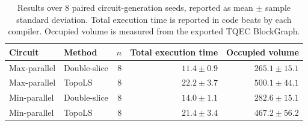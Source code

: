 \begin{table}[t]
    \centering
    \setlength{\tabcolsep}{10pt}
    \caption{Results over 8 paired circuit-generation seeds, reported as mean $\pm$ sample standard deviation.
    Total execution time is reported in code beats by each compiler. Occupied volume is measured from the exported TQEC BlockGraph.}
    \label{tab:topols_circuit_seeds}
    \begin{tabular}{llrrr}
        \toprule
        Circuit & Method & $n$ & Total execution time & Occupied volume \\
        \midrule
        Max-parallel & Double-slice & 8 & $11.4 \pm 0.9$ & $265.1 \pm 15.1$ \\
        Max-parallel & TopoLS & 8 & $22.2 \pm 3.7$ & $500.1 \pm 44.1$ \\
        Min-parallel & Double-slice & 8 & $14.0 \pm 1.1$ & $282.6 \pm 15.1$ \\
        Min-parallel & TopoLS & 8 & $21.4 \pm 3.4$ & $467.2 \pm 56.2$ \\
        \bottomrule
    \end{tabular}
\end{table}
